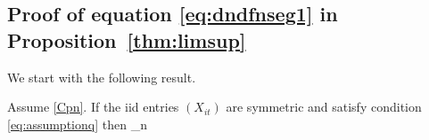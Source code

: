 
\subsection{Proof of equation \eqref{eq:dndfnseg1} in Proposition~\ref{thm:limsup}}\label{sec:5.6}
We start with the following result.
\begin{proposition}\label{prop:unified}
Assume \eqref{Cpn}. If the iid entries $(X_{it})$ are symmetric and satisfy condition \eqref{eq:assumptionq} then
\beam\label{eq:jo1}
\limsup_{n\to \infty}   \sqrt{\gamma}\,\quad \as
\eeam
\end{proposition}


